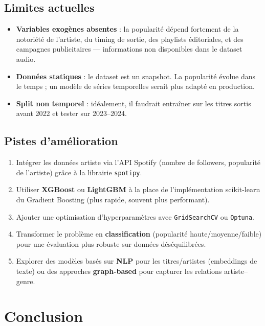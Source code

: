 \documentclass[12pt, a4paper]{article}
\begin{document}
\subsection{Limites actuelles}

\begin{itemize}[leftmargin=1.5cm]
  \item \textbf{Variables exogènes absentes} : la popularité dépend fortement de la
        notoriété de l'artiste, du timing de sortie, des playlists éditoriales, et des
        campagnes publicitaires — informations non disponibles dans le dataset audio.
  \item \textbf{Données statiques} : le dataset est un snapshot. La popularité évolue
        dans le temps ; un modèle de séries temporelles serait plus adapté en production.
  \item \textbf{Split non temporel} : idéalement, il faudrait entraîner sur les titres
        sortis avant 2022 et tester sur 2023–2024.
\end{itemize}

\subsection{Pistes d'amélioration}

\begin{enumerate}[leftmargin=1.5cm]
  \item Intégrer les données artiste via l'API Spotify (nombre de followers, popularité
        de l'artiste) grâce à la librairie \texttt{spotipy}.
  \item Utiliser \textbf{XGBoost} ou \textbf{LightGBM} à la place de l'implémentation
        scikit-learn du Gradient Boosting (plus rapide, souvent plus performant).
  \item Ajouter une optimisation d'hyperparamètres avec \texttt{GridSearchCV} ou
        \texttt{Optuna}.
  \item Transformer le problème en \textbf{classification} (popularité haute/moyenne/faible)
        pour une évaluation plus robuste sur données déséquilibrées.
  \item Explorer des modèles basés sur \textbf{NLP} pour les titres/artistes
        (embeddings de texte) ou des approches \textbf{graph-based} pour capturer les
        relations artiste–genre.
\end{enumerate}

\section{Conclusion}
\end{document}
